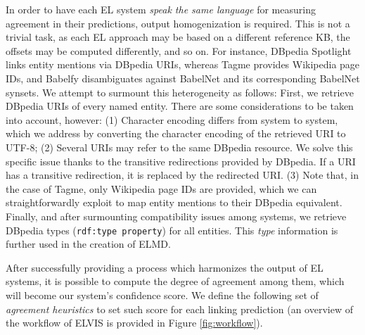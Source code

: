 In order to have each EL system \textit{speak the same language} for measuring agreement in their predictions, output homogenization is required. This is not a trivial task, as each EL approach may be based on a different reference KB, the offsets may be computed differently, and so on. For instance, DBpedia Spotlight links entity mentions via DBpedia URIs, whereas Tagme provides Wikipedia page IDs, and Babelfy disambiguates against BabelNet \cite{NavigliPonzetto2012} and its corresponding BabelNet synsets. 
We attempt to surmount this heterogeneity as follows: First, we retrieve DBpedia URIs of every named entity. There are some considerations to be taken into account, however: (1) Character encoding differs from system to system, which we address by converting the character encoding of the retrieved URI to \textsc{UTF-8}; (2) Several URIs may refer to the same DBpedia resource. We solve this specific issue thanks to the transitive redirections provided by DBpedia. If a URI has a transitive redirection, it is replaced by the redirected URI. (3) Note that, in the case of Tagme, only Wikipedia page IDs are provided, which we can straightforwardly exploit to map entity mentions to their DBpedia equivalent. Finally, and after surmounting compatibility issues among systems, we retrieve DBpedia types (\texttt{rdf:type property}) for all entities. This \textit{type} information is further used in the creation of \textsc{ELMD}.



After successfully providing a process which harmonizes the output of EL systems, it is possible to compute the degree of agreement among them, which will become our system's confidence score. We define the following set of \textit{agreement heuristics} to set such score for each linking prediction (an overview of the workflow of \textsc{ELVIS} is provided in Figure \ref{fig:workflow}).


